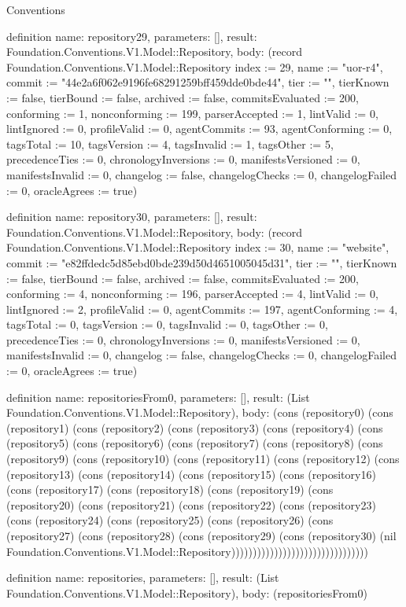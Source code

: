 \begin{lexlean}{Conventions}
\begin{semanticmodule}
definition{
  name: repository29,
  parameters: [],
  result: Foundation.Conventions.V1.Model::Repository,
  body: (record Foundation.Conventions.V1.Model::Repository {index := 29, name := "uor-r4", commit := "44e2a6f062e9196fe68291259bff459dde0bde44", tier := "", tierKnown := false, tierBound := false, archived := false, commitsEvaluated := 200, conforming := 1, nonconforming := 199, parserAccepted := 1, lintValid := 0, lintIgnored := 0, profileValid := 0, agentCommits := 93, agentConforming := 0, tagsTotal := 10, tagsVersion := 4, tagsInvalid := 1, tagsOther := 5, precedenceTies := 0, chronologyInversions := 0, manifestsVersioned := 0, manifestsInvalid := 0, changelog := false, changelogChecks := 0, changelogFailed := 0, oracleAgrees := true})
}

definition{
  name: repository30,
  parameters: [],
  result: Foundation.Conventions.V1.Model::Repository,
  body: (record Foundation.Conventions.V1.Model::Repository {index := 30, name := "website", commit := "e82ffdedc5d85ebd0bde239d50d4651005045d31", tier := "", tierKnown := false, tierBound := false, archived := false, commitsEvaluated := 200, conforming := 4, nonconforming := 196, parserAccepted := 4, lintValid := 0, lintIgnored := 2, profileValid := 0, agentCommits := 197, agentConforming := 4, tagsTotal := 0, tagsVersion := 0, tagsInvalid := 0, tagsOther := 0, precedenceTies := 0, chronologyInversions := 0, manifestsVersioned := 0, manifestsInvalid := 0, changelog := false, changelogChecks := 0, changelogFailed := 0, oracleAgrees := true})
}

definition{
  name: repositoriesFrom0,
  parameters: [],
  result: (List Foundation.Conventions.V1.Model::Repository),
  body: (cons (repository0) (cons (repository1) (cons (repository2) (cons (repository3) (cons (repository4) (cons (repository5) (cons (repository6) (cons (repository7) (cons (repository8) (cons (repository9) (cons (repository10) (cons (repository11) (cons (repository12) (cons (repository13) (cons (repository14) (cons (repository15) (cons (repository16) (cons (repository17) (cons (repository18) (cons (repository19) (cons (repository20) (cons (repository21) (cons (repository22) (cons (repository23) (cons (repository24) (cons (repository25) (cons (repository26) (cons (repository27) (cons (repository28) (cons (repository29) (cons (repository30) (nil Foundation.Conventions.V1.Model::Repository))))))))))))))))))))))))))))))))
}

definition{
  name: repositories,
  parameters: [],
  result: (List Foundation.Conventions.V1.Model::Repository),
  body: (repositoriesFrom0)
}


\end{semanticmodule}
\end{lexlean}

